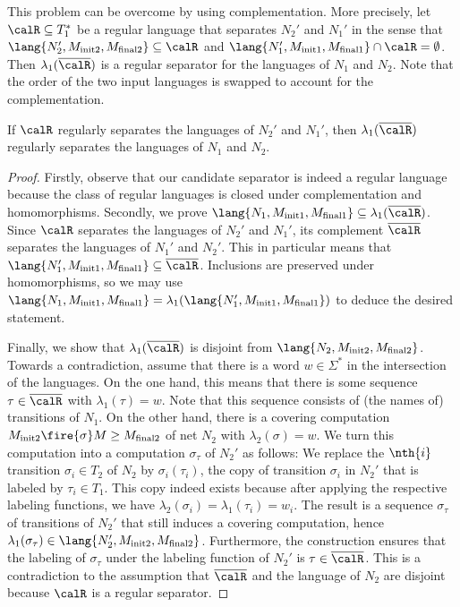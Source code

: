 \documentclass[../../diss.tex]{subfiles}
\begin{document}
This problem can be overcome by using complementation.
More precisely, let $\calR \subseteq T_1^*$ be a regular language that separates $N_2'$ and $N_1'$ in the sense that $\lang{N_2',M_{\init2},M_{\final2}} \subseteq \calR$ and $\lang{N_1',M_{\init1},M_{\final1}} \cap \calR = \emptyset$.
Then $\lambda_1(\overline{\calR})$ is a regular separator for the languages of $N_1$ and $N_2$.
Note that the order of the two input languages is swapped to account for the complementation.

\begin{proposition}%
\label{Proposition:PNSeparabilityDeterminization}%
    If $\calR$ regularly separates the languages of $N_2'$ and $N_1'$, then $\lambda_1(\overline{\calR})$ regularly separates the languages of $N_1$ and $N_2$.
\end{proposition}

\begin{proof}
    Firstly, observe that our candidate separator is indeed a regular language because the class of regular languages is closed under complementation and homomorphisms.
    Secondly, we prove $\lang{N_1,M_{\init1},M_{\final1}} \subseteq \lambda_1(\overline{\calR})$.
    Since $\calR$ separates the languages of $N_2'$ and $N_1'$, its complement $\overline{\calR}$ separates the languages of $N_1'$ and $N_2'$.
    This in particular means that $\lang{N_1',M_{\init1},M_{\final1}} \subseteq  \overline{\calR}$.
    Inclusions are preserved under homomorphisms, so we may use $\lang{N_1,M_{\init1},M_{\final1}} = \lambda_1(\lang{N_1',M_{\init1},M_{\final1}})$ to deduce the desired statement.

    Finally, we show that $\lambda_1(\overline{\calR})$ is disjoint from $\lang{N_2,M_{\init2},M_{\final2}}$.
    Towards a contradiction, assume that there is a word $w \in \Sigma^*$ in the intersection of the languages.
    On the one hand, this means that there is some sequence $\tau \in \overline{\calR}$ with $\lambda_1(\tau) = w$.
    Note that this sequence consists of (the names of) transitions of $N_1$.
    On the other hand, there is a covering computation $M_{\init2} \fire{\sigma} M \geq M_{\final2}$ of net $N_2$ with $\lambda_2(\sigma) = w$.
    We turn this computation into a computation $\sigma_\tau$ of $N_2'$ as follows:
    We replace the $\nth{i}$ transition $\sigma_i \in T_2$ of $N_2$ by $\sigma_i(\tau_i)$, the copy of transition $\sigma_i$ in $N_2'$ that is labeled by $\tau_i \in T_1$.
    This copy indeed exists because after applying the respective labeling functions, we have $\lambda_2(\sigma_i) = \lambda_1(\tau_i) = w_i$.
%
    The result is a sequence $\sigma_\tau$ of transitions of $N_2'$ that still induces a covering computation, hence $\lambda_1(\sigma_\tau) \in \lang{N_2',M_{\init2},M_{\final2}}$.
    Furthermore, the construction ensures that the labeling of $\sigma_\tau$ under the labeling function of $N_2'$ is $\tau \in \overline{\calR}$.
    This is a contradiction to the assumption that $\overline{\calR}$ and the language of $N_2$ are disjoint because $\calR$ is a regular separator.
\end{proof}
\end{document}
